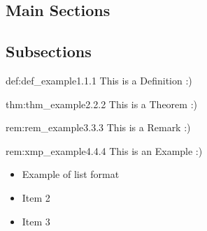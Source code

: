 \documentclass[landscape, 8pt]{extarticle}
\begin{document}
\setlength{\abovedisplayskip}{3.5pt}
\setlength{\belowdisplayskip}{3.5pt}
\setlength{\abovedisplayshortskip}{3.5pt}
\setlength{\belowdisplayshortskip}{3.5pt}

\begin{multicols}{3}
\raggedcolumns %
\section{\huge Main Sections}
\vspace{-5pt}

\subsection*{Subsections}

\begin{dfn}{def:def_example}{1.1.1}
This is a Definition :)
\end{dfn}
\vspace{-5pt}

\begin{thm}{thm:thm_example}{2.2.2}
This is a Theorem :)
\end{thm}
\vspace{-5pt}

\begin{rem}{rem:rem_example}{3.3.3}
This is a Remark :)
\end{rem}
\vspace{-5pt}

\begin{xmp}{rem:xmp_example}{4.4.4}
This is an Example :)
\renewcommand\labelitemi{\tiny$\bullet$}
\begin{itemize}
    \setlength\itemsep{0em}
    \item Example of list format
    \item Item 2
    \item Item 3
\end{itemize}
\end{xmp}
\vspace{-5pt}




\end{multicols}
\end{document}
